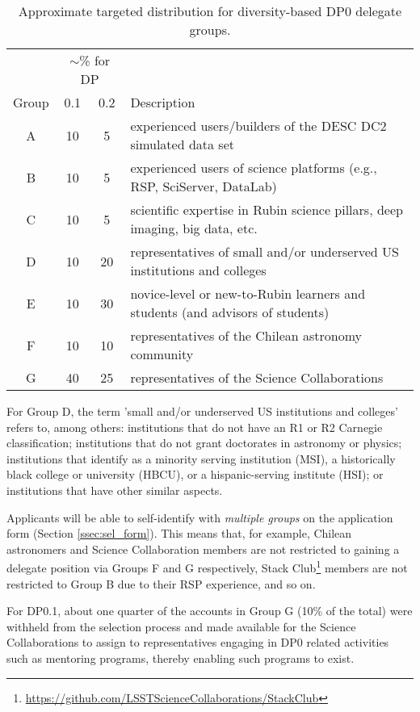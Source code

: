 \documentclass[DM,lsstdraft,authoryear,toc]{lsstdoc}
\begin{document}
\begin{table}[!h]
\centering
\caption{Approximate targeted distribution for diversity-based DP0 delegate groups.}\label{tab:delegate_groups}
\begin{tabular}{cccl}
\hline
 & \multicolumn{2}{c}{$\sim$\% for DP} & \\
Group & 0.1 & 0.2 & Description \\
\hline \hline
A & 10 & 5 & experienced users/builders of the DESC DC2 simulated data set \\
B & 10 & 5 & experienced users of science platforms (e.g., RSP, SciServer, DataLab) \\
C & 10 & 5 & scientific expertise in Rubin science pillars, deep imaging, big data, etc. \\
D & 10 & 20 & representatives of small and/or underserved US institutions and colleges \\
E & 10 & 30 & novice-level or new-to-Rubin learners and students (and advisors of students) \\
F & 10 & 10 & representatives of the Chilean astronomy community \\
G & 40 & 25 & representatives of the Science Collaborations \\
\hline
\end{tabular}
\end{table}

For Group D, the term 'small and/or underserved US institutions and colleges' refers to, among others: institutions that do not have an R1 or R2 Carnegie classification; institutions that do not grant doctorates in astronomy or physics; institutions that identify as a minority serving institution (MSI), a historically black college or university (HBCU), or a hispanic-serving institute (HSI); or institutions that have other similar aspects.

Applicants will be able to self-identify with {\it multiple groups} on the application form (Section \ref{ssec:sel_form}).
This means that, for example, Chilean astronomers and Science Collaboration members are not restricted to gaining a delegate position via Groups F and G respectively, Stack Club\footnote{\url{https://github.com/LSSTScienceCollaborations/StackClub}} members are not restricted to Group B due to their RSP experience, and so on.

For DP0.1, about one quarter of the accounts in Group G (10\% of the total) were withheld from the selection process and made available for the Science Collaborations to assign to representatives engaging in DP0 related activities such as mentoring programs, thereby enabling such programs to exist.
\end{document}

